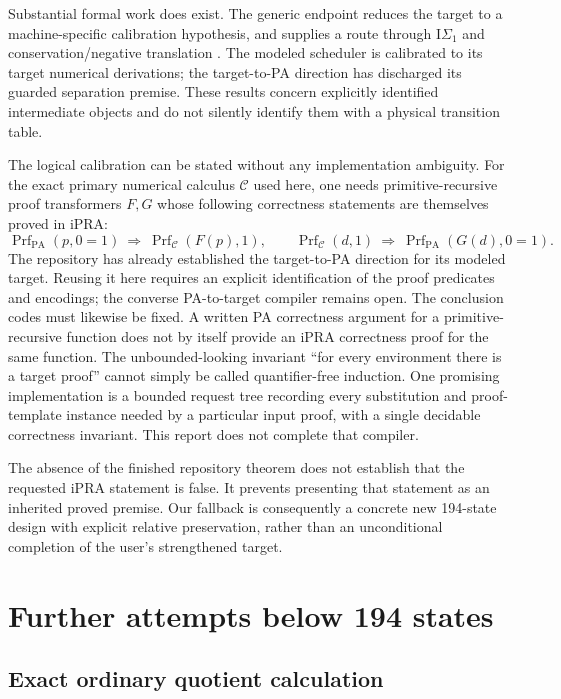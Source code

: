 \documentclass[11pt,letterpaper]{article}
\theoremstyle{definition}\newtheorem{definition}[theorem]{Definition}
\theoremstyle{remark}\newtheorem{remark}[theorem]{Remark}
\newcommand{\PA}{\mathrm{PA}}
\newcommand{\Prf}{\operatorname{Prf}}
\newcommand{\file}[1]{\path{#1}}
\begin{document}
Substantial formal work does exist. The generic
\file{isigma1-machine} endpoint reduces the target to a machine-specific
calibration hypothesis, and \file{isigma1-transfer} supplies a route through
$\mathrm I\Sigma_1$ and conservation/negative translation \cite{isigmachine,isigtransfer}.
The modeled scheduler is calibrated to its target numerical derivations;
the target-to-PA direction has discharged its guarded separation premise.
These results concern explicitly identified intermediate objects and do
not silently identify them with a physical transition table.

The logical calibration can be stated without any implementation ambiguity.
For the exact primary numerical calculus $\mathcal C$ used here, one needs
primitive-recursive proof transformers $F,G$ whose following correctness
statements are themselves proved in iPRA:
\[
 \Prf_{\PA}(p,0=1)\ \Longrightarrow\ \Prf_{\mathcal C}(F(p),1),
 \qquad
 \Prf_{\mathcal C}(d,1)\ \Longrightarrow\ \Prf_{\PA}(G(d),0=1).
\]
The repository has already established the target-to-PA direction for its
modeled target. Reusing it here requires an explicit identification of the
proof predicates and encodings; the converse PA-to-target compiler remains
open. The conclusion codes must likewise be fixed.
A written PA correctness argument for a primitive-recursive function does
not by itself provide an iPRA correctness proof for the same function.
The unbounded-looking invariant ``for every environment there is a target
proof'' cannot simply be called quantifier-free induction. One promising
implementation is a bounded request tree recording every substitution and
proof-template instance needed by a particular input proof, with a single
decidable correctness invariant. This report does not complete that
compiler.

The absence of the finished repository theorem does not establish that the
requested iPRA statement is false. It prevents presenting that statement as
an inherited proved premise. Our fallback is consequently a concrete new
194-state design with explicit relative preservation, rather than an
unconditional completion of the user's strengthened target.

\section{Further attempts below 194 states}
\label{sec:search}

\subsection{Exact ordinary quotient calculation}
\end{document}
